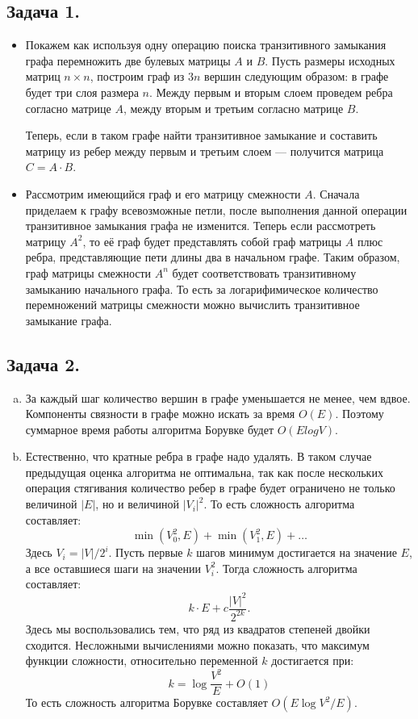 \documentclass{article}
\begin{document}
\subsection*{Задача 1.}
\begin{itemize}
    \item
    Покажем как используя одну операцию поиска транзитивного замыкания
    графа перемножить две булевых матрицы $A$ и $B$. Пусть размеры исходных
    матриц $n \times n$, построим граф из $3n$ вершин следующим образом:
    в графе будет три слоя размера $n$. Между первым и вторым слоем
    проведем ребра согласно матрице $A$, между вторым и третьим согласно
    матрице $B$.

    Теперь, если в таком графе найти транзитивное замыкание и составить
    матрицу из ребер между первым и третьим слоем --- получится матрица
    $C = A \cdot B$.

    \item
    Рассмотрим имеющийся граф и его матрицу смежности $A$. Сначала приделаем
    к графу всевозможные петли, после выполнения данной операции
    транзитивное замыкания графа не изменится. Теперь если рассмотреть матрицу
    $A^2$, то её граф будет представлять собой граф матрицы $A$ плюс ребра,
    представляющие пети длины два в начальном графе. Таким образом,
    граф матрицы смежности $A^n$ будет соответствовать транзитивному
    замыканию начального графа. То есть за логарифимическое количество
    перемножений матрицы смежности можно вычислить транзитивное
    замыкание графа.
\end{itemize}

\subsection*{Задача 2.}
\begin{enumerate}[a)]
    \item
    За каждый шаг количество вершин в графе уменьшается не менее, чем вдвое.
    Компоненты связности в графе можно искать за время $O(E)$. Поэтому
    суммарное время работы алгоритма Борувке будет $O(E logV)$.
    \item
    Естественно, что кратные ребра в графе надо удалять. В таком случае
    предыдущая оценка алгоритма не оптимальна, так как после нескольких
    операция стягивания количество ребер в графе будет ограничено не только
    величиной $|E|$, но и величиной $|V_i|^2$. То есть сложность алгоритма
    составляет:
    $$
        \min(V_0^2, E) + \min(V_1^2, E) + \ldots
    $$
    Здесь $V_i = |V| / 2^i$. Пусть первые $k$ шагов минимум
    достигается на значение $E$, а все оставшиеся шаги на значении
    $V_i^2$. Тогда сложность алгоритма составляет:
    $$
        k \cdot E + c \frac{|V|^2}{2^{2k}}.
    $$
    Здесь мы воспользовались тем, что ряд из квадратов степеней двойки
    сходится. Несложными вычислениями можно показать, что максимум
    функции сложности, относительно переменной $k$ достигается при:
    $$
        k = \log \frac{V^2}{E} + O(1)
    $$
    То есть сложность алгоритма Борувке составляет $O(E \log V^2 / E)$.
\end{enumerate}
\end{document}
